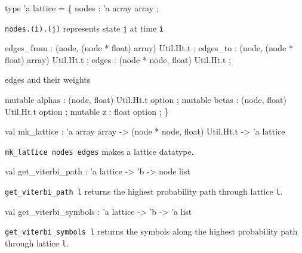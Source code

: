 \documentclass[11pt]{article}
\begin{document}
\label{type:Lattice.lattice}\begin{ocamldoccode}
type 'a lattice = \{
  nodes : 'a array array ;
\end{ocamldoccode}
\begin{ocamldoccomment}
{\tt{nodes.(i).(j)}} represents state {\tt{j}} at time {\tt{i}}
\end{ocamldoccomment}
\begin{ocamldoccode}
  edges_from : (node, (node * float) array) Util.Ht.t ;
  edges_to : (node, (node * float) array) Util.Ht.t ;
  edges : (node * node, float) Util.Ht.t ;
\end{ocamldoccode}
\begin{ocamldoccomment}
edges and their weights
\end{ocamldoccomment}
\begin{ocamldoccode}
  mutable alphas : (node, float) Util.Ht.t option ;
  mutable betas : (node, float) Util.Ht.t option ;
  mutable z : float option ;
\}
\end{ocamldoccode}




\label{val:Lattice.mk-underscorelattice}\begin{ocamldoccode}
val mk_lattice :
  'a array array ->
  (node * node, float) Util.Ht.t -> 'a lattice
\end{ocamldoccode}
\begin{ocamldocdescription}
{\tt{mk\_lattice nodes edges}} makes a lattice datatype.


\end{ocamldocdescription}




\label{val:Lattice.get-underscoreviterbi-underscorepath}\begin{ocamldoccode}
val get_viterbi_path : 'a lattice -> 'b -> node list
\end{ocamldoccode}
\begin{ocamldocdescription}
{\tt{get\_viterbi\_path l}} returns the highest probability path through lattice {\tt{l}}.


\end{ocamldocdescription}




\label{val:Lattice.get-underscoreviterbi-underscoresymbols}\begin{ocamldoccode}
val get_viterbi_symbols : 'a lattice -> 'b -> 'a list
\end{ocamldoccode}
\begin{ocamldocdescription}
{\tt{get\_viterbi\_symbols l}} returns the symbols along the highest probability path
    through lattice {\tt{l}}.


\end{ocamldocdescription}
\end{document}
